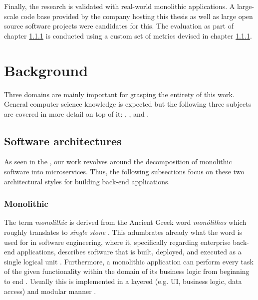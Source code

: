 \documentclass[12pt,a4paper]{report}
\begin{document}
Finally, the research is validated with real-world monolithic applications.
A large-scale code base provided by the company hosting this thesis as well as
large open source software projects were candidates for this.
The evaluation as part of chapter \ref{} is conducted using
a custom set of metrics devised in chapter \ref{}.




\chapter{Background} \label{chap:background}

Three domains are mainly important for grasping the entirety of this work.
General computer science knowledge is expected but the following
three subjects are covered in more detail on top of it:
\textit{},
\textit{}, and
\textit{}.



\section{Software architectures} \label{sect:background-architecture}

As seen in the \textit{}, our work revolves around
the decomposition of monolithic software into microservices.
Thus, the following subsections focus on these two architectural styles for
building back-end applications.


\subsection{Monolithic}

The term \textit{monolithic} is derived from the Ancient Greek word
\textit{monólithos} which roughly translates to \textit{single stone} \cite{press2011oxford}.
This adumbrates already what the word is used for in software engineering,
where it, specifically regarding enterprise back-end applications,
describes software that is built, deployed, and executed
as a single logical unit \cite{ms-fowler}.
Furthermore, a monolithic application can perform every task of the given functionality
within the domain of its business logic from beginning to end \cite{monolith}.
Usually this is implemented in a layered (e.g. UI, business logic, data access)
and modular manner \cite{ms-fowler, monolith}.
\end{document}
